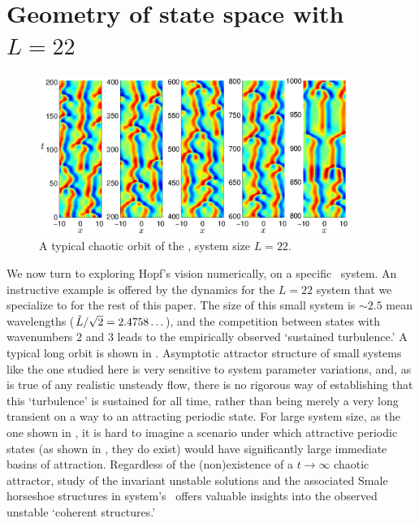 
\section{Geometry of state space with $L=22$}
\label{sec:L22}

\begin{figure}[t]
\begin{center}
\includegraphics[width=0.9\textwidth, clip=true]{figs/ks_L22_long_orbit.eps}
\end{center}
\caption{\color{blue}
A typical chaotic orbit of the \KSe, system size $L=22$.
     } \label{f:ks_L22}
\end{figure}
We now turn to exploring Hopf's vision
numerically, on a specific \KS\ system.
An instructive example is offered by the dynamics for
the  $L=22$  system
that we specialize to for the rest of this paper.
The size of this
small system is $\sim 2.5$ mean wavelengths
($\tilde{L}/\sqrt{2}= 2.4758\ldots$),
and the competition between states with wavenumbers 2 and 3
leads to the empirically observed `sustained turbulence.'
{\color{blue} A typical long orbit is shown in .}
Asymptotic attractor structure of small systems like
the one studied here
is very sensitive to system parameter variations, and,
as is true of
any realistic unsteady flow, there is no rigorous way of
establishing that this `turbulence' is sustained for all time,
rather than being
merely a very long transient on a way to an
attracting periodic state.
For large system size, as the one shown in , it is
hard to imagine a scenario under which attractive periodic states
(as shown in , they do exist) would have significantly
large immediate basins of attraction.
Regardless of the
(non)existence of a $t \to \infty$ chaotic attractor, study
of the invariant unstable solutions and the associated Smale
horseshoe structures in system's \statesp\ offers valuable
insights into the observed unstable `coherent structures.'

